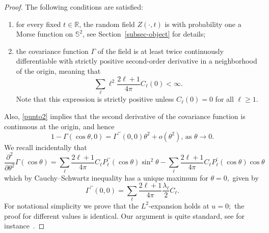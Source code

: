 \documentclass[AHL,Unicode,longabstracts,published]{cedram}
\newcommand{\bbS}{\mathbb{S}}
\newcommand{\bbR}{\mathbb{R}}
\begin{document}
\begin{proof}
The following conditions are satisfied:
\begin{enumerate}
\item \label{punto1}
for every fixed $t\in \bbR$, the random field $Z(\cdot,t)$ is with probability one a Morse function on $\bbS^2$, see Section~\ref{subsec-object} for details;
\item \label{punto2}
the covariance function $\Gamma$ of the field is at least twice continuously differentiable with strictly positive second-order derivative in a neighborhood of the origin, meaning that
\begin{equation*}
\sum_{\ell }\ell ^{2}\frac{2\ell +1}{4\pi }C_{\ell }(0)<\infty \text{.}
\end{equation*}
Note that this expression is strictly positive unless $C_{\ell }(0)=0$ for all $
\ell \geq 1.$
\end{enumerate}

Also, \eqref{punto2} implies that the second derivative of the covariance function is continuous at the origin, and hence
\begin{equation*}
1-\Gamma (\cos \theta,0)=\Gamma ^{\prime \prime }(0,0)\theta ^{2}+o(\theta ^{2})\text{, as }\theta \rightarrow 0\text{.}
\end{equation*}
We recall incidentally that
\begin{equation*}
\frac{\partial ^{2}}{\partial \theta ^{2}}\Gamma (\cos \theta)=\sum_{\ell }
\frac{2\ell +1}{4\pi }C_{\ell }P_{\ell }^{\prime \prime }(\cos \theta)\sin ^{2}\theta -\sum_{\ell }\frac{2\ell +1}{4\pi }C_{\ell }P_{\ell }^{\prime }(\cos \theta)\cos \theta
\end{equation*}
which by Cauchy--Schwartz inequality has a unique maximum for $\theta =0,$ given by
\begin{equation*}
\Gamma ^{\prime \prime }(0,0)=\sum_{\ell }\frac{2\ell +1}{4\pi }\frac{
\lambda _{\ell }}{2}C_{\ell }\text{.}
\end{equation*}
For notational simplicity we prove that the $L^{2}$-expansion holds at $u=0;$ the proof for different values is identical. Our argument is quite standard, see for instance~\cite{MRW}.


\end{proof}
\end{document}
